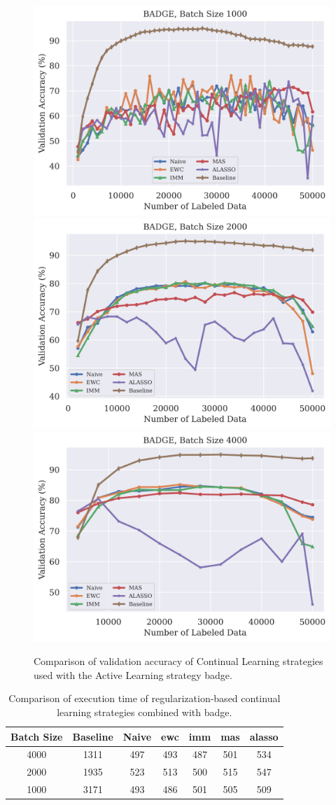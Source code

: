 \begin{figure}[h]
    \centering
    \includegraphics[width=0.32\linewidth]{images/results_CAL/badge_1000b_acc.png} \hfill
    \includegraphics[width=0.32\linewidth]{images/results_CAL/badge_2000b_acc.png} \hfill
    \includegraphics[width=0.32\linewidth]{images/results_CAL/badge_4000b_acc.png}
    \caption[Continual Active Learning with \gls{badge} with varying batch size]{Comparison of validation accuracy of Continual Learning strategies used with the Active Learning strategy
    \gls{badge}.}
    \label{fig:Evaluation:Results:CAL:VaryBatchSizeAcc}
\end{figure}


\begin{table}[h]
    \centering
    \begin{tabular}{c | c c c c c c} 
        Batch Size & Baseline & Naive & \gls{ewc} & \gls{imm} & \gls{mas} & \gls{alasso}\\ 
        \hline 
        4000 & 1311 & 497 & 493 & 487 & 501 & 534 \\
        2000 & 1935 & 523 & 513 & 500 & 515 & 547 \\
        1000 & 3171 & 493 & 486 & 501 & 505 & 509 \\
    \end{tabular}
    \caption{Comparison of execution time of regularization-based continual learning strategies
    combined with \gls{badge}.}
    \label{fig:Evaluation:CAL:BadgeVaryBatchSizeTime}
\end{table}

